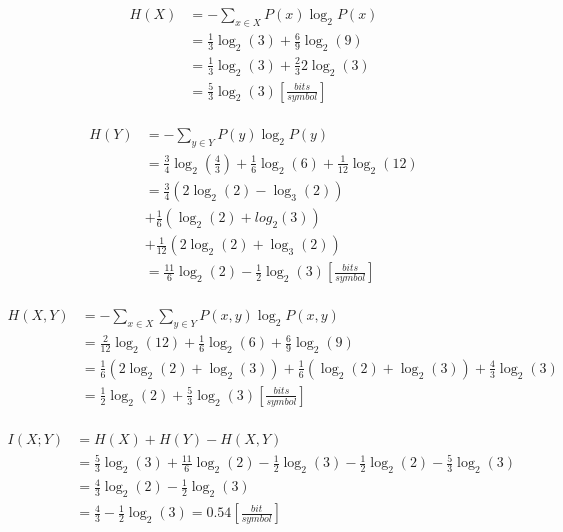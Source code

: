 {\begin{equation*}
\begin{aligned}
    H(X)    &= -\sum_{x \in X} P(x) \log_2 {P(x)}\\
            &= \frac{1}{3} \log_2(3) + \frac{6}{9} \log_2(9)\\
            &= \frac{1}{3} \log_2(3) + \frac{2}{3} 2 \log_2(3)\\
            &= \frac{5}{3} \log_2(3) [\frac{bits}{symbol}]
\end{aligned}
\end{equation*}
\\
\begin{equation*}
\begin{aligned}
    H(Y)    &= -\sum_{y \in Y} P(y) \log_2 {P(y)}\\
            &= \frac{3}{4} \log_2(\frac{4}{3}) + \frac{1}{6} \log_2(6) + \frac{1}{12} \log_2(12)\\
            &= \frac{3}{4}(2 \log_2(2) - \log_3(2))\\
            &+ \frac{1}{6}(\log_2(2) + log_2(3))\\
            &+ \frac{1}{12}(2 \log_2(2) + \log_3(2))\\
            &= \frac{11}{6} \log_2(2) - \frac{1}{2} \log_2(3) [\frac{bits}{symbol}]
\end{aligned}
\end{equation*}
\\
\begin{equation*}
\begin{aligned}
    H(X,Y)  &= -\sum_{x \in X}\sum_{y \in Y} P(x,y) \log_2{P(x,y)}\\
            &= \frac{2}{12} \log_2(12) + \frac{1}{6} \log_2(6) + \frac{6}{9} \log_2(9)\\
            &= \frac{1}{6} (2\log_2(2) + \log_2(3)) + \frac{1}{6}(\log_2(2) + \log_2(3)) + \frac{4}{3} \log_2(3)\\
            &= \frac{1}{2} \log_2(2) + \frac{5}{3} \log_2(3) [\frac{bits}{symbol}]
\end{aligned}
\end{equation*}
\\
\begin{equation*}
\begin{aligned}
    I(X;Y)  &= H(X) + H(Y) - H(X,Y)\\
    &= \frac{5}{3} \log_2(3) + \frac{11}{6} \log_2(2) - \frac{1}{2} \log_2(3) - \frac{1}{2} \log_2(2) - \frac{5}{3} \log_2(3)\\
    &= \frac{4}{3} \log_2(2) - \frac{1}{2} \log_2(3)\\
    &= \frac{4}{3} - \frac{1}{2} \log_2(3) = 0.54 [\frac{bit}{symbol}]
\end{aligned}
\end{equation*}
}

